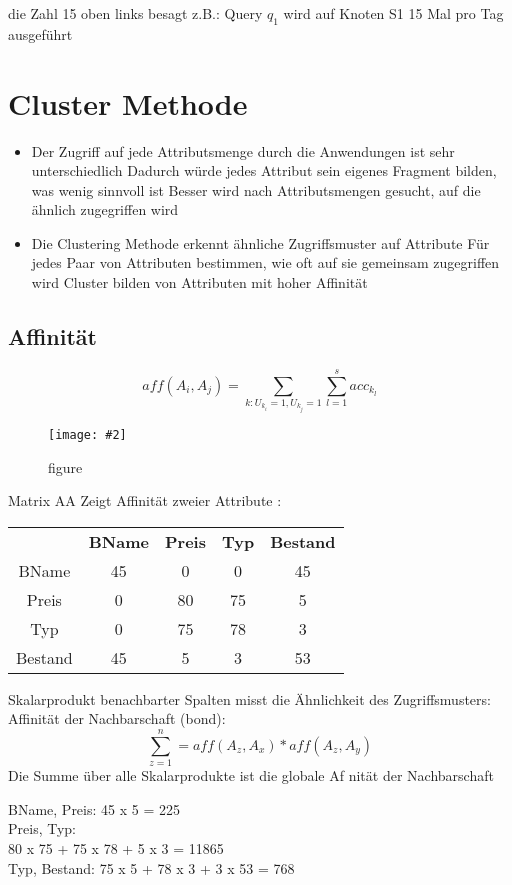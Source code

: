\documentclass[a4paper,10pt,titlepage=false]{scrreprt}
\newcommand{\pic}[2][figure]{\begin{figure}[h]
 \centering
 \texttt{[image: \#2]}
 \caption{#1}
\end{figure}
}
\begin{document}
die Zahl 15 oben links besagt z.B.: Query $q_1$ wird auf
Knoten S1 15 Mal pro Tag ausgeführt

\section{Cluster Methode}
\begin{itemize}
\item  Der Zugriff auf jede Attributsmenge durch die
Anwendungen ist sehr unterschiedlich
\subitem Dadurch würde jedes Attribut sein eigenes Fragment
bilden, was wenig sinnvoll ist
\subitem Besser wird nach Attributsmengen gesucht, auf die
ähnlich zugegriffen wird
\item Die Clustering Methode erkennt ähnliche Zugriffsmuster auf
Attribute
\subitem Für jedes Paar von Attributen bestimmen, wie oft auf
sie gemeinsam zugegriffen wird
\subitem Cluster bilden von Attributen mit hoher Affinität
\end{itemize}

\subsection{Affinität}
\begin{framed}
 \begin{equation}
  aff (A_i,A_j) = \sum_{k : U_{k_i}=1,U_{k_j}=1} \sum_{l=1}^s acc_{k_l} 
 \end{equation}

\end{framed}

\pic{affin.png}

Matrix AA Zeigt Affinität zweier Attribute :
\begin{tabular}{c c c c c}
 &\textbf{BName} & \textbf{Preis}  & \textbf{Typ} & \textbf{Bestand}\\
BName & 45 & 0 & 0 & 45 \\
Preis & 0 & 80 &75 & 5 \\
Typ & 0 & 75 & 78 & 3 \\
Bestand & 45 & 5 & 3 & 53 \\
\end{tabular}

\begin{framed}
 Skalarprodukt benachbarter Spalten
misst die Ähnlichkeit des
Zugriffsmusters: Affinität der
Nachbarschaft (bond):
\begin{equation}
 \sum_{z=1}^{n} = aff(A_z,A_x)*aff(A_z,A_y)
\end{equation}
Die Summe über alle Skalarprodukte ist
die globale Af nität der Nachbarschaft

\end{framed}
BName, Preis: 45 x 5 = 225\\
Preis, Typ:\\
80 x 75 + 75 x 78 + 5 x 3 = 11865\\
Typ, Bestand:
75 x 5 + 78 x 3 + 3 x 53 = 768\\
\end{document}
